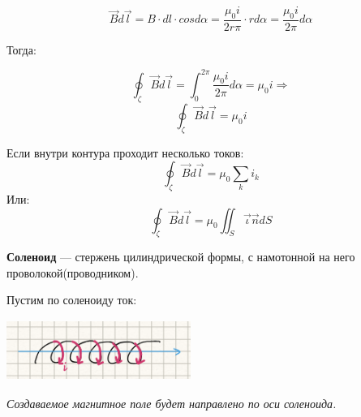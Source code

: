 \documentclass[../main.tex]{subfiles}
\begin{document}
\[\vec B d \vec l = B \cdot dl \cdot cos{d \alpha} = \frac{\mu_0 i}{2r \pi} \cdot r d \alpha = \frac{\mu_0 i}{2 \pi} d \alpha\]

Тогда:

\[\oint_{\zeta} \vec B d \vec l = \int_{0}^{2 \pi} \frac{\mu_0 i}{2 \pi} d \alpha = \mu_0 i \Rightarrow \]
\[\oint_{\zeta} \vec B d \vec l = \mu_0 i\]

Если внутри контура проходит несколько токов:
\[\oint_{\zeta} \vec B d \vec l = \mu_0 \sum_{k} i_k\]
Или:
\[\oint_{\zeta} \vec B d \vec l = \mu_0 \iint_{S} \vec \iota  \vec n dS\]

 \textbf{Соленоид} --- стержень цилиндрической формы, с намотонной на него проволокой(проводником).

\vspace{5px}

Пустим по соленоиду ток:
\begin{center}
    \includegraphics[width=6cm, height=2cm]{../img/soly.png}
\end{center}

\textit{Создаваемое магнитное поле будет направлено по оси соленоида.}

\vspace{5px}
\end{document}

